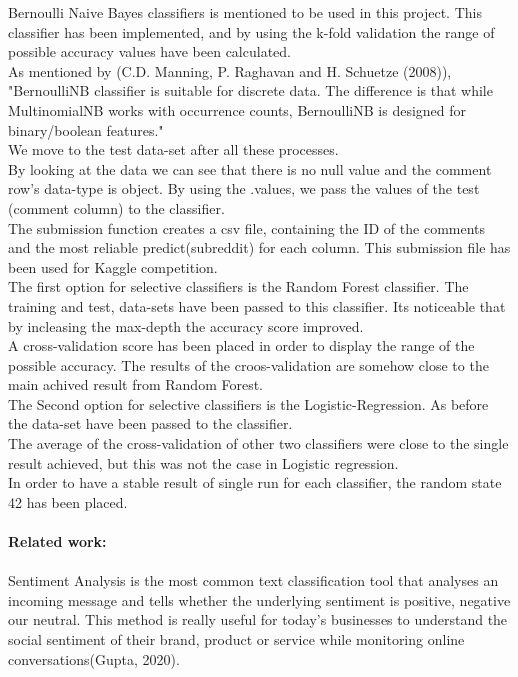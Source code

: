 \documentclass[12pt]{report}
\begin{document}
	Bernoulli Naive Bayes classifiers is mentioned to be used in this project. This classifier has been implemented, and by using the k-fold validation the range of possible accuracy values have been calculated.\\
	As mentioned by (C.D. Manning, P. Raghavan and H. Schuetze (2008)), "BernoulliNB classifier is suitable for discrete data. The difference is that while MultinomialNB works with occurrence counts, BernoulliNB is designed for binary/boolean features." \\
	We move to the test data-set after all these processes. \\
	By looking at the data we can see that there is no null value and the comment row's data-type is object.
	By using the .values, we pass the values of the test (comment column) to the classifier.\\
	The submission function creates a csv file, containing the ID of the comments and the most reliable predict(subreddit) for each column. This submission file has been used for Kaggle competition.\\	
	The first option for selective classifiers is the Random Forest classifier. The training and test, data-sets have been passed to this classifier. Its noticeable that by incleasing the max-depth the accuracy score improved.\\	
	A cross-validation score has been placed in order to display the range of the possible accuracy. The results of the croos-validation are somehow close to the main achived result from Random Forest.\\
	The Second option for selective classifiers is the Logistic-Regression. As before the data-set have been passed to the classifier. \\
	The average of the cross-validation of other two classifiers were close to the single result achieved, but this was not the case in Logistic regression.\\
	In order to have a stable result of single run for each classifier, the random state 42 has been placed. \\	  		

	\paragraph{Related work:}
	\paragraph{}
	Sentiment Analysis is the most common text classification tool that analyses an incoming message and tells whether the underlying sentiment is positive, negative our neutral. This method is really useful for today's businesses to understand the social sentiment of their brand, product or service while monitoring online conversations(Gupta, 2020).\\
	
\end{document}
